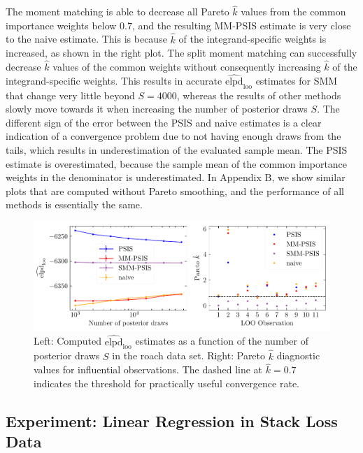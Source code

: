 \documentclass[12pt]{article}
\begin{document}
The moment matching is able to decrease all Pareto $\hat{k}$
values from the common importance weights below $0.7$, and the resulting MM-PSIS estimate is very close
to the naive estimate.
This is because $\hat{k}$
of the integrand-specific weights is increased, as shown in the right plot.
%
The split moment matching can successfully decrease $\hat{k}$ values of the common weights
without consequently increasing $\hat{k}$ of the integrand-specific weights.
This results in accurate $\widehat{\mathrm{elpd}}_{\mathrm{loo}}$ estimates for SMM
that change very little beyond $S = 4000$, whereas the
results of other methods slowly move towards it when increasing the number of posterior draws $S$.
The different sign of the error between the PSIS and naive estimates is a clear indication of a convergence problem
due to not having enough draws from the tails, which results in underestimation
of the evaluated sample mean.
The PSIS estimate is overestimated, because the sample mean
of the common importance weights in the denominator is underestimated.
In Appendix B, we show similar plots that are computed without Pareto smoothing,
and the performance of all methods is essentially the same.





\begin{figure}[h]
\centering
\includegraphics[width=\textwidth]{figs/roach_diff_comb.pdf}
\caption{Left: Computed $\widehat{\mathrm{elpd}}_{\mathrm{loo}}$
estimates as a function of the number of posterior draws $S$
in the roach data set. Right: Pareto $\hat{k}$ diagnostic values for influential observations. The dashed line
at $\hat{k} = 0.7$ indicates the threshold for practically useful convergence rate.} \label{fig:roach_diff}
\end{figure}








\subsection{Experiment: Linear Regression in Stack Loss Data} \label{sec:stackloss}
\end{document}
